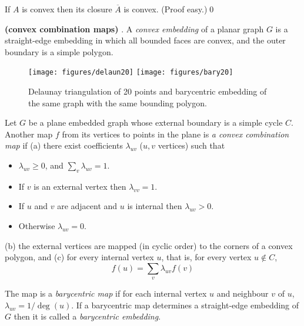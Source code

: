 \begin{proposition}
\label{closure convex} If $A$ is convex then its closure
$\overline{A}$ is convex. (Proof easy.)\qed
\end{proposition}



\begin{definition}
\label{convex combination map} {\bf (convex combination maps)} {\rm \cite{floater03}}.
A {\em convex embedding} of a planar graph $G$ is a straight-edge
embedding
in which all bounded faces are convex, and the outer boundary
is a simple polygon.

\begin{figure}
\centerline{
\texttt{[image: figures/delaun20]}\hspace*{.5in}
\texttt{[image: figures/bary20]}\hspace*{.5in}\ \ 
}
\caption{Delaunay triangulation of 20 points and barycentric
embedding of the same graph with the same bounding
polygon.}
\label{delaun20.fig}
\end{figure}


Let $G$ be a plane embedded graph whose external boundary is
a simple cycle $C$.
Another map $f$ from its vertices to
points in the plane is {\em a convex combination map} if
{\rm (a)} there exist coefficients $\lambda_{uv}$ ($u,v$ vertices) such that
\begin{itemize}
\item
$\lambda_{uv} \geq 0$,
and
$\sum_v \lambda_{uv} = 1$.
\item
If $v$ is an external vertex then $\lambda_{vv} = 1.$
\item
If $u$ and $v$ are adjacent and $u$ is internal
then $\lambda_{uv} > 0$.
\item
Otherwise $\lambda_{uv} = 0$.
\end{itemize}

{\rm (b)}
the external
vertices are mapped (in cyclic order) to the corners
of a convex polygon, and {\rm (c)} for
every internal vertex $u$, that is, for every vertex $u\notin C$,
\begin{equation}
\label{weighted average of neighbours} f(u) =  \sum_v \lambda_{uv} f(v)
\end{equation}

The map is a {\em barycentric map} if
for each internal vertex $u$ and neighbour $v$ of
$u$, $\lambda_{uv} = 1/\deg(u)$.
If a barycentric map determines a straight-edge embedding
of $G$ then it is called a {\em barycentric embedding}.
\end{definition}

